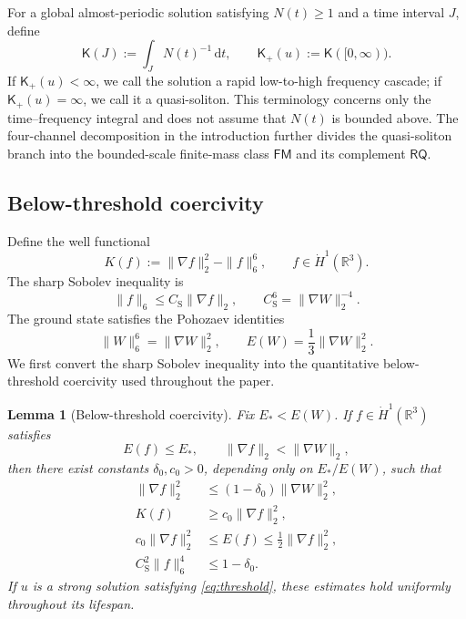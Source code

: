 \documentclass{interact}
\numberwithin{equation}{section}
\theoremstyle{plain}
\newtheorem{lemma}[theorem]{Lemma}
\theoremstyle{definition}
\theoremstyle{remark}
\newcommand{\R}{\mathbb R}
\newcommand{\cS}{C_{\mathrm S}}
\newcommand{\dd}{\,\mathrm d}
\begin{document}
For a global almost-periodic solution satisfying $N(t)\ge1$ and a time interval $J$, define
\[
 \mathsf K(J):=\int_JN(t)^{-1}\dd t,
 \qquad
 \mathsf K_+(u):=\mathsf K([0,\infty)).
\]
If $\mathsf K_+(u)<\infty$, we call the solution a rapid low-to-high frequency cascade; if $\mathsf K_+(u)=\infty$, we call it a quasi-soliton. This terminology concerns only the time--frequency integral and does not assume that $N(t)$ is bounded above. The four-channel decomposition in the introduction further divides the quasi-soliton branch into the bounded-scale finite-mass class $\mathsf{FM}$ and its complement $\mathsf{RQ}$.

\subsection{Below-threshold coercivity}

Define the well functional
\[
 K(f):=\|\nabla f\|_2^2-\|f\|_6^6,
 \qquad f\in\dot H^1(\R^3).
\]
The sharp Sobolev inequality is
\begin{equation}\label{eq:sharp-Sobolev}
 \|f\|_6\le\cS\|\nabla f\|_2,
 \qquad
 \cS^6=\|\nabla W\|_2^{-4}.
\end{equation}
The ground state satisfies the Pohozaev identities
\begin{equation}\label{eq:Pohozaev}
 \|W\|_6^6=\|\nabla W\|_2^2,
 \qquad
 E(W)=\frac13\|\nabla W\|_2^2.
\end{equation}
We first convert the sharp Sobolev inequality into the quantitative below-threshold coercivity used throughout the paper.

\begin{lemma}[Below-threshold coercivity]\label{lem:coercivity}
Fix $E_*<E(W)$. If $f\in\dot H^1(\R^3)$ satisfies
\[
 E(f)\le E_*,
 \qquad
 \|\nabla f\|_2<\|\nabla W\|_2,
\]
then there exist constants $\delta_0,c_0>0$, depending only on $E_*/E(W)$, such that
\begin{align}
 \|\nabla f\|_2^2
 &\le(1-\delta_0)\|\nabla W\|_2^2,
 \label{eq:gradient-gap}\\
 K(f)&\ge c_0\|\nabla f\|_2^2,
 \label{eq:K-positive}\\
 c_0\|\nabla f\|_2^2
 &\le E(f)\le\frac12\|\nabla f\|_2^2,
 \label{eq:E-equivalence}\\
 \cS^2\|f\|_6^4&\le1-\delta_0.
 \label{eq:L6-gap}
\end{align}
If $u$ is a strong solution satisfying \eqref{eq:threshold}, these estimates hold uniformly throughout its lifespan.
\end{lemma}
\end{document}
